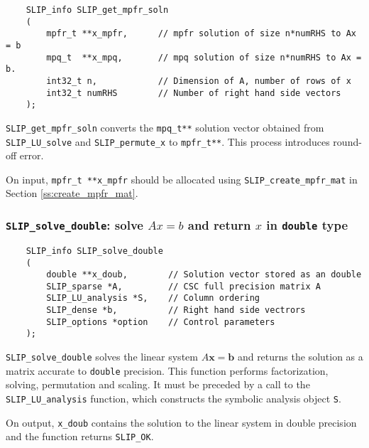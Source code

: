 \documentclass[12pt]{article}
\theoremstyle{definition}
\begin{document}
\begin{mdframed}[userdefinedwidth=6in]
{\footnotesize
\begin{verbatim}
    SLIP_info SLIP_get_mpfr_soln
    (
        mpfr_t **x_mpfr,      // mpfr solution of size n*numRHS to Ax = b
        mpq_t  **x_mpq,       // mpq solution of size n*numRHS to Ax = b.
        int32_t n,            // Dimension of A, number of rows of x
        int32_t numRHS        // Number of right hand side vectors
    );
\end{verbatim}
} \end{mdframed}

\verb|SLIP_get_mpfr_soln| converts the \verb|mpq_t**| solution vector obtained
from \verb|SLIP_LU_solve| and \verb|SLIP_permute_x| to \verb|mpfr_t**|. This
process introduces round-off error.

On input, \verb|mpfr_t **x_mpfr| should be allocated using
\verb|SLIP_create_mpfr_mat| in Section \ref{ss:create_mpfr_mat}.

\cprotect\subsubsection{\verb|SLIP_solve_double|: solve $Ax=b$ and return $x$ in \verb|double| type}
\label{ss:SLIP_solve_double}

\begin{mdframed}[userdefinedwidth=6in]
{\footnotesize
\begin{verbatim}
    SLIP_info SLIP_solve_double
    (
        double **x_doub,        // Solution vector stored as an double
        SLIP_sparse *A,         // CSC full precision matrix A
        SLIP_LU_analysis *S,    // Column ordering
        SLIP_dense *b,          // Right hand side vectrors
        SLIP_options *option    // Control parameters
    );
\end{verbatim}
} \end{mdframed}

\verb|SLIP_solve_double| solves the linear system $A\mathbf{x}=\mathbf{b}$ and
returns the solution as a matrix accurate to \verb|double| precision. This
function performs factorization, solving, permutation and scaling.  It must be
preceded by a call to the \verb|SLIP_LU_analysis| function, which constructs the
symbolic analysis object \verb|S|.

On output, \verb|x_doub| contains the solution to the linear system in
double precision and the function returns \verb|SLIP_OK|.
\end{document}
